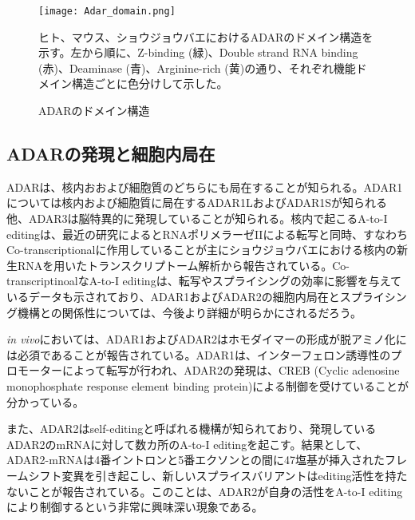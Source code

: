 \begin{figure}[!htbp]
	\begin{center}
		\texttt{[image: Adar\_domain.png]}
	\end{center}
	\caption{ADARのドメイン構造}
	\begin{flushleft}
		\small{ヒト、マウス、ショウジョウバエにおけるADARのドメイン構造を示す。左から順に、Z-binding (緑)、Double strand RNA binding (赤)、Deaminase (青)、Arginine-rich (黄)の通り、それぞれ機能ドメイン構造ごとに色分けして示した。}
	\end{flushleft}
	\label{fig:adar_domain}
\end{figure}

\subsection{ADARの発現と細胞内局在}
ADARは、核内おおよび細胞質のどちらにも局在することが知られる。ADAR1については核内および細胞質に局在するADAR1LおよびADAR1Sが知られる他、ADAR3は脳特異的に発現していることが知られる。核内で起こるA-to-I editingは、最近の研究によるとRNAポリメラーゼIIによる転写と同時、すなわちCo-transcriptionalに作用していることが主にショウジョウバエにおける核内の新生RNAを用いたトランスクリプトーム解析から報告されている。Co-transcriptinoalなA-to-I editingは、転写やスプライシングの効率に影響を与えているデータも示されており、ADAR1およびADAR2の細胞内局在とスプライシング機構との関係性については、今後より詳細が明らかにされるだろう。
\par
\textit{in vivo}においては、ADAR1およびADAR2はホモダイマーの形成が脱アミノ化には必須であることが報告されている。ADAR1は、インターフェロン誘導性のプロモーターによって転写が行われ、ADAR2の発現は、CREB (Cyclic adenosine monophosphate response element binding protein)による制御を受けていることが分かっている。
\par
また、ADAR2はself-editingと呼ばれる機構が知られており、発現しているADAR2のmRNAに対して数カ所のA-to-I editingを起こす。結果として、ADAR2-mRNAは4番イントロンと5番エクソンとの間に47塩基が挿入されたフレームシフト変異を引き起こし、新しいスプライスバリアントはediting活性を持たないことが報告されている。このことは、ADAR2が自身の活性をA-to-I editingにより制御するという非常に興味深い現象である。

